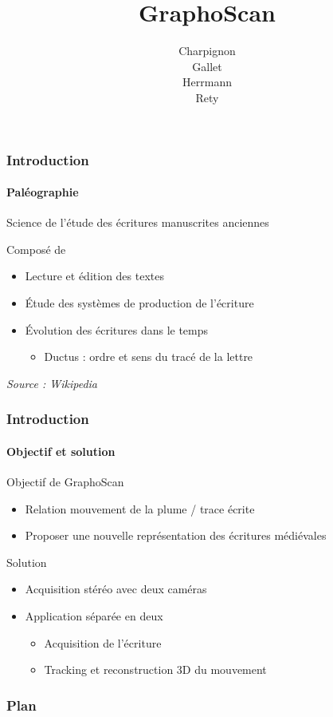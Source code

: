 \documentclass[12pt]{beamer}
\author{Charpignon \\Gallet \\Herrmann \\Rety\\}
\title{GraphoScan}
\institute[]{Université d'Orléans \\ \medskip \textit{Encadré par : Matthieu EXBRAYAT} }
\begin{document}
\begin{frame}
\titlepage
\end{frame}


\begin{frame}
\frametitle{Introduction}
\framesubtitle{Paléographie}
\begin{definition}
Science de l'étude des écritures manuscrites anciennes
\end{definition}
\begin{block}{Composé de}
\begin{itemize}
\item Lecture et édition des textes
\item Étude des systèmes de production de l'écriture
\item Évolution des écritures dans le temps
	\begin{itemize}
	\item Ductus : ordre et sens du tracé de la lettre
	\end{itemize}
\end{itemize}
\end{block}
\textit{Source : Wikipedia}
\end{frame}

\begin{frame}
\frametitle{Introduction}
\framesubtitle{Objectif et solution}
\begin{block}{Objectif de GraphoScan}
\begin{itemize}
\item Relation mouvement de la plume / trace écrite
\item Proposer une nouvelle représentation des écritures médiévales
\end{itemize}
\end{block}

\begin{block}{Solution}
\begin{itemize}
\item Acquisition stéréo avec deux caméras
\item Application séparée en deux
	\begin{itemize}
	\item Acquisition de l'écriture
	\item Tracking et reconstruction 3D du mouvement
	\end{itemize}
\end{itemize}
\end{block}
\end{frame}


\begin{frame}
\frametitle{Plan}
\tableofcontents
\end{frame}
\end{document}
